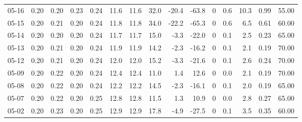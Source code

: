 \begin{threeparttable}
{\begin{tabular}{lrrrrrrrrrrrrrr}
  05-16 &          0.20 &          0.20 &          0.23 &        0.24 &                11.6 &               11.6 &                32.0 &      -20.4 &        -63.8 &              0 &                 0.6 &             10.3 &            0.99 &                  55.00 \\
  05-15 &          0.20 &          0.21 &          0.20 &        0.24 &                11.8 &               11.8 &                34.0 &      -22.2 &        -65.3 &              0 &                 0.6 &              6.5 &            0.61 &                  60.00 \\
  05-14 &          0.20 &          0.20 &          0.20 &        0.24 &                11.7 &               11.7 &                15.0 &       -3.3 &        -22.0 &              0 &                 0.1 &              2.5 &            0.23 &                  65.00 \\
  05-13 &          0.20 &          0.21 &          0.20 &        0.24 &                11.9 &               11.9 &                14.2 &       -2.3 &        -16.2 &              0 &                 0.1 &              2.1 &            0.19 &                  70.00 \\
  05-12 &          0.20 &          0.21 &          0.20 &        0.24 &                12.0 &               12.0 &                15.2 &       -3.3 &        -21.6 &              0 &                 0.1 &              2.6 &            0.24 &                  70.00 \\
  05-09 &          0.20 &          0.22 &          0.20 &        0.24 &                12.4 &               12.4 &                11.0 &        1.4 &         12.6 &              0 &                 0.0 &              2.1 &            0.19 &                  70.00 \\
  05-08 &          0.20 &          0.22 &          0.20 &        0.24 &                12.2 &               12.2 &                14.5 &       -2.3 &        -16.1 &              0 &                 0.1 &              2.0 &            0.19 &                  65.00 \\
  05-07 &          0.20 &          0.22 &          0.20 &        0.25 &                12.8 &               12.8 &                11.5 &        1.3 &         10.9 &              0 &                 0.0 &              2.8 &            0.27 &                  65.00 \\
  05-02 &          0.20 &          0.23 &          0.20 &        0.25 &                12.9 &               12.9 &                17.8 &       -4.9 &        -27.5 &              0 &                 0.1 &              3.5 &            0.35 &                  60.00 \\

\end{tabular}}
\end{threeparttable}
